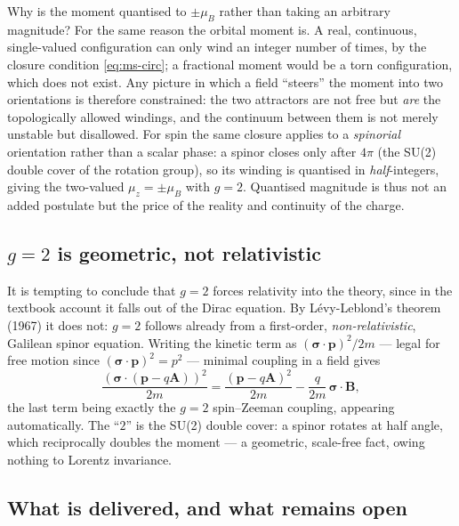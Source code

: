Why is the moment quantised to $\pm\mu_B$ rather than taking an arbitrary magnitude? For the same reason the
orbital moment is. A real, continuous, single-valued configuration can only wind an integer number of times, by
the closure condition \eqref{eq:ms-circ}; a fractional moment would be a torn configuration, which does not
exist. Any picture in which a field ``steers'' the moment into two orientations is therefore constrained: the two
attractors are not free but \emph{are} the topologically allowed windings, and the continuum between them is not
merely unstable but disallowed. For spin the same closure applies to a \emph{spinorial} orientation rather than a
scalar phase: a spinor closes only after $4\pi$ (the SU(2) double cover of the rotation group), so its winding is
quantised in \emph{half}-integers, giving the two-valued $\mu_z = \pm\mu_B$ with $g = 2$. Quantised magnitude is
thus not an added postulate but the price of the reality and continuity of the charge.

\subsection*{$g = 2$ is geometric, not relativistic}

It is tempting to conclude that $g = 2$ forces relativity into the theory, since in the textbook account it falls
out of the Dirac equation. By Lévy-Leblond's theorem (1967) it does not: $g = 2$ follows already from a
first-order, \emph{non-relativistic}, Galilean spinor equation. Writing the kinetic term as
$(\boldsymbol{\sigma}\cdot\mathbf{p})^2/2m$ --- legal for free motion since
$(\boldsymbol{\sigma}\cdot\mathbf{p})^2 = p^2$ --- minimal coupling in a field gives
\begin{equation}
\frac{(\boldsymbol{\sigma}\cdot(\mathbf{p} - q\mathbf{A}))^2}{2m}
= \frac{(\mathbf{p} - q\mathbf{A})^2}{2m} - \frac{q}{2m}\,\boldsymbol{\sigma}\cdot\mathbf{B},
\label{eq:ms-pauli}
\end{equation}
the last term being exactly the $g = 2$ spin--Zeeman coupling, appearing automatically. The ``$2$'' is the SU(2)
double cover: a spinor rotates at half angle, which reciprocally doubles the moment --- a geometric, scale-free
fact, owing nothing to Lorentz invariance.

\subsection*{What is delivered, and what remains open}

